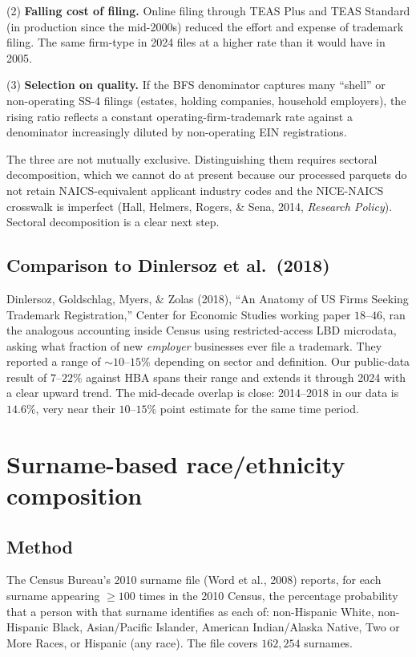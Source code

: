 \documentclass[11pt]{article}
\begin{document}
(2) \textbf{Falling cost of filing.} Online filing through TEAS Plus
and TEAS Standard (in production since the mid-2000s) reduced the
effort and expense of trademark filing. The same firm-type in 2024
files at a higher rate than it would have in 2005.

(3) \textbf{Selection on quality.} If the BFS denominator captures
many ``shell'' or non-operating SS-4 filings (estates, holding
companies, household employers), the rising ratio reflects a
constant operating-firm-trademark rate against a denominator
increasingly diluted by non-operating EIN registrations.

The three are not mutually exclusive. Distinguishing them requires
sectoral decomposition, which we cannot do at present because our
processed parquets do not retain NAICS-equivalent applicant industry
codes and the NICE-NAICS crosswalk is imperfect (Hall, Helmers,
Rogers, \& Sena, 2014, \emph{Research Policy}). Sectoral
decomposition is a clear next step.

\subsection*{Comparison to Dinlersoz et al.\ (2018)}

Dinlersoz, Goldschlag, Myers, \& Zolas (2018), ``An Anatomy of US
Firms Seeking Trademark Registration,'' Center for Economic Studies
working paper $18$--$46$, ran the analogous accounting inside Census
using restricted-access LBD microdata, asking what fraction of new
\emph{employer} businesses ever file a trademark. They reported a
range of $\sim 10$--$15\%$ depending on sector and definition. Our
public-data result of $7$--$22\%$ against HBA spans their range and
extends it through 2024 with a clear upward trend. The mid-decade
overlap is close: 2014--2018 in our data is $14.6\%$, very near
their $10$--$15\%$ point estimate for the same time period.

\section{Surname-based race/ethnicity composition}

\subsection*{Method}
The Census Bureau's 2010 surname file (Word et al., 2008) reports,
for each surname appearing $\geq 100$ times in the 2010 Census, the
percentage probability that a person with that surname identifies as
each of: non-Hispanic White, non-Hispanic Black, Asian/Pacific
Islander, American Indian/Alaska Native, Two or More Races, or
Hispanic (any race). The file covers $162{,}254$ surnames.
\end{document}
